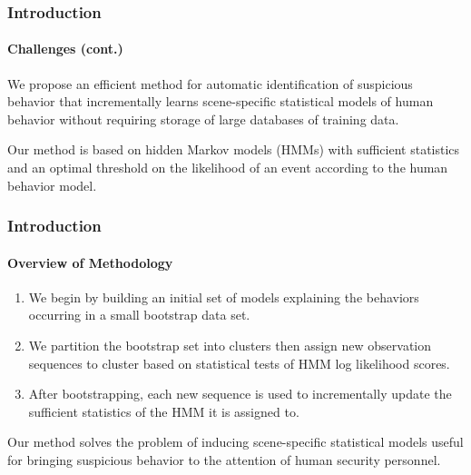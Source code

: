 
\begin{frame}
    \frametitle{Introduction}
    \framesubtitle{Challenges (cont.)}

    We propose an efficient method for 
    automatic identification of suspicious behavior that 
    \alert{incrementally} learns scene-specific statistical models 
    of human behavior \alert{without} requiring storage of 
    large databases of training data.

    \bigskip

    Our method is based on hidden Markov models (HMMs) with 
    \alert{sufficient statistics} and an optimal threshold 
    on the likelihood of an event according to the human behavior model.

\end{frame}
    

\ifnum{}

\begin{frame}
    \frametitle{Introduction}
    \framesubtitle{Overview of Methodology}
   
    \begin{enumerate}
        \item We begin by building an initial set of models explaining 
            the behaviors occurring in a small bootstrap data set.
        \item We partition the bootstrap set into clusters then assign 
            new observation sequences to cluster based on statistical 
            tests of HMM log likelihood scores.
        \item After bootstrapping, each new sequence is used to incrementally 
            update the sufficient statistics of the HMM it is assigned to. 
    \end{enumerate}

    \medskip

    Our method solves the problem of inducing 
    scene-specific statistical models useful for bringing suspicious 
    behavior to the attention of human security personnel.

\end{frame}

\fi


